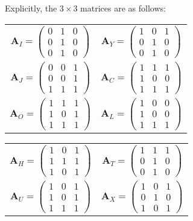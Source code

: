 \documentclass{somasmsc}
\begin{document}
Explicitly, the $3 \times 3$ matrices are as follows:
\begin{center}
\begin{tabular}{c c}
    $\mathbf{A}_I =
    \begin{pmatrix}
        0 & 1 & 0 \\
        0 & 1 & 0 \\
        0 & 1 & 0
    \end{pmatrix}$ &
    $\mathbf{A}_Y =
    \begin{pmatrix}
        1 & 0 & 1 \\
        0 & 1 & 0 \\
        0 & 1 & 0
    \end{pmatrix}$ \\
    $\mathbf{A}_J =
    \begin{pmatrix}
        0 & 0 & 1 \\
        0 & 0 & 1 \\
        1 & 1 & 1
    \end{pmatrix}$ &
    $\mathbf{A}_C =
    \begin{pmatrix}
        1 & 1 & 1 \\
        1 & 0 & 0 \\
        1 & 1 & 1
    \end{pmatrix}$ \\
    $\mathbf{A}_O =
    \begin{pmatrix}
        1 & 1 & 1 \\
        1 & 0 & 1 \\
        1 & 1 & 1
    \end{pmatrix}$ &
    $\mathbf{A}_L =
    \begin{pmatrix}
        1 & 0 & 0 \\
        1 & 0 & 0 \\
        1 & 1 & 1
    \end{pmatrix}$
\end{tabular}
\begin{tabular}{c c}
    $\mathbf{A}_H =
    \begin{pmatrix}
        1 & 0 & 1 \\
        1 & 1 & 1 \\
        1 & 0 & 1
    \end{pmatrix}$ &
    $\mathbf{A}_T =
    \begin{pmatrix}
        1 & 1 & 1 \\
        0 & 1 & 0 \\
        0 & 1 & 0
    \end{pmatrix}$ \\
    $\mathbf{A}_U =
    \begin{pmatrix}
        1 & 0 & 1 \\
        1 & 0 & 1 \\
        1 & 1 & 1
    \end{pmatrix}$ &
    $\mathbf{A}_X =
    \begin{pmatrix}
        1 & 0 & 1 \\
        0 & 1 & 0 \\
        1 & 0 & 1
    \end{pmatrix}$
\end{tabular}
\end{center}
\end{document}

